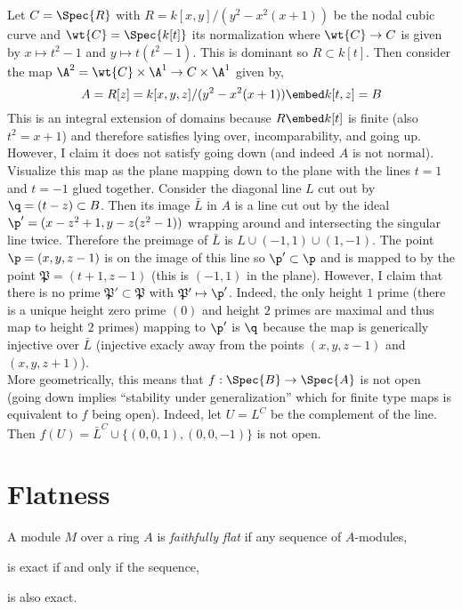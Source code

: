 \documentclass[12pt]{article}
\begin{document}
\begin{example}
Let $C = \Spec{R}$ with $R = k[x,y]/(y^2 - x^2(x + 1))$ be the nodal cubic curve and $\wt{C} = \Spec{k[t]}$ its normalization where $\wt{C} \to C$ is given by $x \mapsto t^2-1$ and $y \mapsto t(t^2-1)$. This is dominant so $R \subset k[t]$. Then consider the map $\A^2 = \wt{C} \times \A^1 \to C \times \A^1$ given by,
\[ A = R[z] = k[x,y,z]/(y^2 - x^2(x + 1)) \embed k[t,z] = B \]
This is an integral extension of domains because $R \embed k[t]$ is finite (also $t^2 = x + 1$) and therefore satisfies lying over, incomparability, and going up. However, I claim it does not satisfy going down (and indeed $A$ is not normal). Visualize this map as the plane mapping down to the plane with the lines $t = 1$ and $t = -1$ glued together. Consider the diagonal line $L$ cut out by $\q = (t - z) \subset B$. Then its image $\bar{L}$ in $A$ is a line cut out by the ideal $\p' = (x - z^2 + 1, y - z(z^2 - 1))$ wrapping around and intersecting the singular line twice. Therefore the preimage of $\bar{L}$ is $L \cup (-1,1) \cup (1,-1)$. The point $\p = (x,y,z-1)$ is on the image of this line so $\p' \subset \p$ and is mapped to by the point $\mathfrak{P} = (t+1, z-1)$ (this is $(-1,1)$ in the plane). However, I claim that there is no prime $\mathfrak{P}' \subset \mathfrak{P}$ with $\mathfrak{P}' \mapsto \p'$. Indeed, the only height $1$ prime (there is a unique height zero prime $(0)$ and height $2$ primes are maximal and thus map to height $2$ primes) mapping to $\p'$ is $\q$ because the map is generically injective over $\bar{L}$ (injective exacly away from the points $(x,y,z-1)$ and $(x,y,z+1)$). 
\bigskip\\
More geometrically, this means that $f : \Spec{B} \to \Spec{A}$ is not open (going down implies ``stability under generalization'' which for finite type maps is equivalent to $f$ being open). Indeed, let $U = L^C$ be the complement of the line. Then $f(U) = \bar{L}^C \cup \{(0,0,1), (0,0,-1)\}$ is not open.
\end{example}

\section{Flatness}

\begin{defn}
A module $M$ over a ring $A$ is \textit{faithfully flat} if any sequence of $A$-modules,
\begin{center}
\end{center}
is exact if and only if the sequence,
\begin{center}
\end{center}
is also exact. 
\end{defn}
\end{document}
